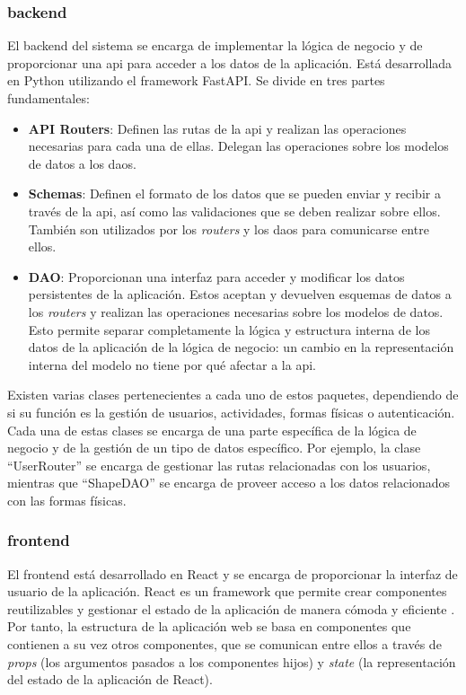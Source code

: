 \subsubsection{\Gls{backend}}
El \gls{backend} del sistema se encarga de implementar la lógica de negocio y de
proporcionar una \gls{api} para acceder a los datos de la aplicación. Está
desarrollada en Python utilizando el \gls{framework} FastAPI. Se divide en tres
partes fundamentales:
\begin{itemize}
    \item \textbf{API Routers}: Definen las rutas de la \gls{api} y realizan las operaciones necesarias
        para cada una de ellas. Delegan las operaciones sobre los modelos de datos a los \glspl{dao}.

    \item \textbf{Schemas}: Definen el formato de los datos que se pueden enviar y recibir a través
        de la \gls{api}, así como las validaciones que se deben realizar sobre ellos. También son
        utilizados por los \textit{routers} y los \glspl{dao} para comunicarse entre ellos.

    \item \textbf{DAO}: Proporcionan una interfaz para acceder y modificar los datos persistentes
        de la aplicación. Estos aceptan y devuelven esquemas de datos a los \textit{routers} y
        realizan las operaciones necesarias sobre los modelos de datos. Esto permite separar
        completamente la lógica y estructura interna de los datos de la aplicación de la lógica
        de negocio: un cambio en la representación interna del modelo no tiene por qué afectar
        a la \gls{api}.
\end{itemize}

Existen varias clases pertenecientes a cada uno de estos paquetes, dependiendo de si su función
es la gestión de usuarios, actividades, formas físicas o autenticación. Cada una de estas clases
se encarga de una parte específica de la lógica de negocio y de la gestión de un tipo de datos
específico. Por ejemplo, la clase \enquote{UserRouter} se encarga de gestionar las rutas relacionadas
con los usuarios, mientras que \enquote{ShapeDAO} se encarga de proveer acceso a los datos relacionados
con las formas físicas.

\subsubsection{\Gls{frontend}}
El \gls{frontend} está desarrollado en React y se encarga de proporcionar la interfaz de
usuario de la aplicación. React es un \gls{framework} que permite crear componentes reutilizables
y gestionar el estado de la aplicación de manera cómoda y eficiente \parencite{react}. Por tanto,
la estructura de la aplicación web se basa en componentes que contienen a su vez otros componentes,
que se comunican entre ellos a través de \textit{props} (los argumentos pasados a los componentes
hijos) y \textit{state} (la representación del estado de la aplicación de React).

